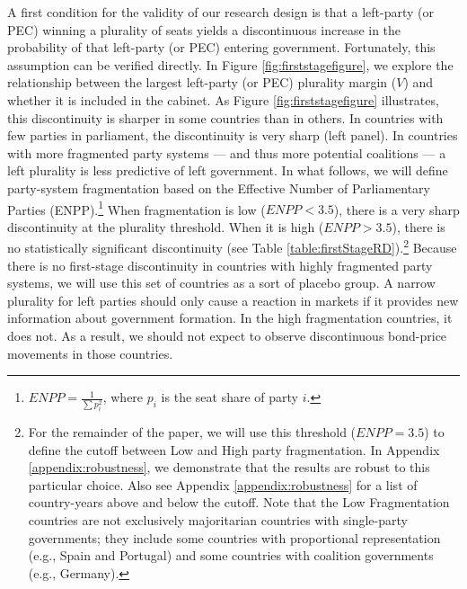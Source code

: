 \documentclass[12pt]{article}
\begin{document}
A first condition for the validity of our research design is that a left-party (or PEC) winning a plurality of seats yields a discontinuous increase in the probability of that left-party (or PEC) entering government. Fortunately, this assumption can be verified directly. In Figure \ref{fig:firststagefigure}, we explore the relationship between the largest left-party (or PEC) plurality margin ($V$) and whether it is included in the cabinet. As Figure \ref{fig:firststagefigure} illustrates, this discontinuity is sharper in some countries than in others. In countries with few parties in parliament, the discontinuity is very sharp (left panel). In countries with more fragmented party systems --- and thus more potential coalitions --- a left plurality is less predictive of left government. In what follows, we will define party-system fragmentation based on the Effective Number of Parliamentary Parties (ENPP).\footnote{$ENPP = \frac{1}{\sum p_i^2}$, where $p_i$ is the seat share of party $i$.} When fragmentation is low ($ENPP < 3.5$), there is a very sharp discontinuity at the plurality threshold. When it is high ($ENPP > 3.5$), there is no statistically significant discontinuity (see Table \ref{table:firstStageRD}).\footnote{For the remainder of the paper, we will use this threshold ($ENPP = 3.5$) to define the cutoff between Low and High party fragmentation. In Appendix \ref{appendix:robustness}, we demonstrate that the results are robust to this particular choice. Also see Appendix \ref{appendix:robustness} for a list of country-years above and below the cutoff. Note that the Low Fragmentation countries are not exclusively majoritarian countries with single-party governments; they include some countries with proportional representation (e.g., Spain and Portugal) and some countries with coalition governments (e.g., Germany).} Because there is no first-stage discontinuity in countries with highly fragmented party systems, we will use this set of countries as a sort of placebo group. A narrow plurality for left parties should only cause a reaction in markets if it provides new information about government formation. In the high fragmentation countries, it does not. As a result, we should not expect to observe discontinuous bond-price movements in those countries. 
\end{document}
